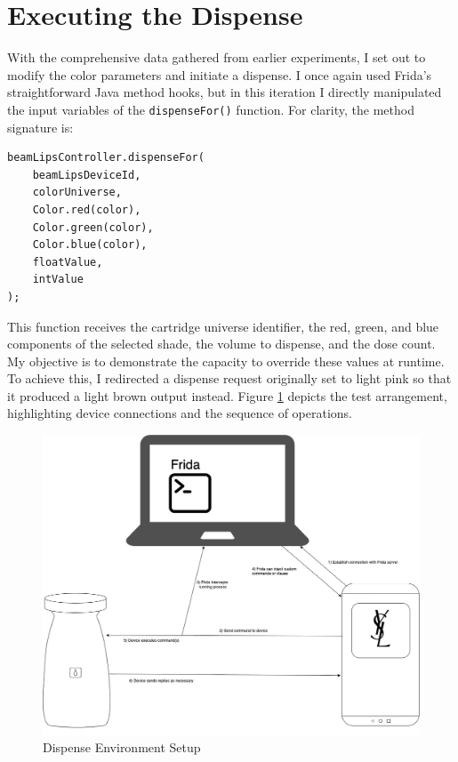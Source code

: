 \section{Executing the Dispense}
With the comprehensive data gathered from earlier experiments, I set out to modify the color parameters and initiate a dispense. I once again used Frida’s straightforward Java method hooks, but in this iteration I directly manipulated the input variables of the \texttt{dispenseFor()} function. For clarity, the method signature is:
\begin{verbatim}
beamLipsController.dispenseFor(
    beamLipsDeviceId,
    colorUniverse,
    Color.red(color),
    Color.green(color),
    Color.blue(color),
    floatValue,
    intValue
);
\end{verbatim}
This function receives the cartridge universe identifier, the red, green, and blue components of the selected shade, the volume to dispense, and the dose count. My objective is to demonstrate the capacity to override these values at runtime. To achieve this, I redirected a dispense request originally set to light pink so that it produced a light brown output instead. Figure \ref{fig:environmentsetup} depicts the test arrangement, highlighting device connections and the sequence of operations.

\begin{figure}[H]
	\centering
	\includegraphics[width=0.7\linewidth]{environmentsetup}
	\caption{Dispense Environment Setup}
	\label{fig:environmentsetup}
\end{figure}

